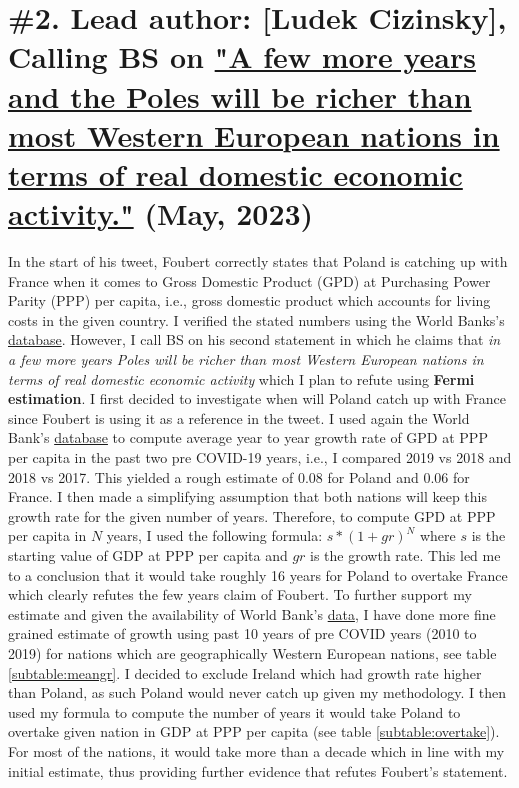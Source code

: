 \documentclass[fleqn,12pt]{article}
\begin{document}
\section{\#2. Lead author: [Ludek Cizinsky], Calling BS on \href{https://twitter.com/d_foubert/status/1660076858451402752?s=20}{"A few more years and the Poles will 
be richer than most Western European nations in terms of real domestic economic activity."} (May, 2023)}
In the start of his tweet, Foubert correctly states that Poland is catching up with France when it comes to Gross Domestic Product (GPD) at Purchasing Power Parity (PPP) per capita, i.e., gross domestic product 
which accounts for living costs in the given country. I verified the stated numbers using the World Banks's \href{https://data.worldbank.org/indicator/NY.GDP.PCAP.PP.CD?locations=FR-PL}{database}. 
However, I call BS on his second statement in which he claims that \textit{in a few more years Poles will be richer than most Western European nations in terms of real domestic economic activity} 
which I plan to refute using \textbf{Fermi estimation}. I first decided to investigate when will Poland catch up with France since Foubert is using it as a reference in the tweet. 
I used again the World Bank's \href{https://data.worldbank.org/indicator/NY.GDP.PCAP.PP.CD?locations=FR-PL}{database} to compute average year to year growth rate of GPD at PPP per capita in the past two 
pre COVID-19 years, i.e., I compared 2019 vs 2018 and 2018 vs 2017. This yielded a rough estimate of $0.08$ for Poland and $0.06$ for France. I then made a simplifying assumption that 
both nations will keep this growth rate for the given number of years.  Therefore, to compute GPD at PPP per capita in $N$ years, I used the following formula:
$s*(1 + gr)^N$ where $s$ is the starting value of GDP at PPP per capita and $gr$ is the growth rate. This led me to a conclusion that it would take roughly 16 years for Poland to 
overtake France which clearly refutes the few years claim of Foubert. To further support my estimate and given the availability of World Bank's
\href{https://data.worldbank.org/indicator/NY.GDP.PCAP.PP.CD?locations=FR-PL}{data}, I have done more fine grained estimate of growth using past 10 years of pre COVID years (2010 to 2019) for 
nations which are geographically Western European nations, see table \ref{subtable:meangr}. I decided to exclude Ireland which had growth rate higher than Poland, as such Poland would 
never catch up given my methodology. I then used my formula to compute the number of years it would take Poland to overtake given nation in GDP at PPP per capita (see table \ref{subtable:overtake}). 
For most of the nations, it would take more than a decade which in line with my initial estimate, thus providing further evidence that refutes Foubert's statement.
\end{document}
